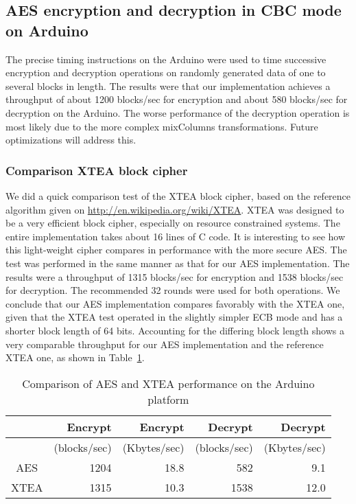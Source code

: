 \subsection{AES encryption and decryption in CBC mode on Arduino}

The precise timing instructions on the Arduino were used to time successive encryption and decryption operations on randomly generated data of one to several blocks in length. The results were that our implementation achieves a throughput of about 1200 blocks/sec for encryption and about 580 blocks/sec for decryption on the Arduino. The worse performance of the decryption operation is most likely due to the more complex mixColumns transformations. Future optimizations will address this.

\subsubsection*{Comparison XTEA block cipher}

We did a quick comparison test of the XTEA \cite{} block cipher, based on the reference algorithm given on \url{http://en.wikipedia.org/wiki/XTEA}. XTEA was designed to be a very efficient block cipher, especially on resource constrained systems. The entire implementation takes about 16 lines of C code. It is interesting to see how this light-weight cipher compares in performance with the more secure AES. The test was performed in the same manner as that for our AES implementation. The results were a throughput of 1315 blocks/sec for encryption and 1538 blocks/sec for decryption. The recommended 32 rounds were used for both operations. We conclude that our AES implementation compares favorably with the XTEA one, given that the XTEA test operated in the slightly simpler ECB mode and has a shorter block length of 64 bits. Accounting for the differing block length shows a very comparable throughput for our AES implementation and the reference XTEA one, as shown in Table~\ref{tab:aes-xtea-comparison}.

\begin{table}[h]
\begin{center}
\begin{tabular}{|c|r|r|r|r|}
\hline  & Encrypt & Encrypt & Decrypt & Decrypt \\
\hline  & (blocks/sec) & (Kbytes/sec) & (blocks/sec) & (Kbytes/sec) \\ 
\hline AES & 1204 & 18.8 & 582 & 9.1 \\ 
\hline XTEA & 1315 & 10.3 & 1538 & 12.0 \\ 
\hline 
\end{tabular}
\end{center}
\caption{Comparison of AES and XTEA performance on the Arduino platform}
\label{tab:aes-xtea-comparison}
\end{table} 

